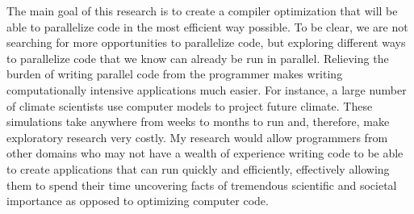 \documentclass[a4paper,12pt]{article}
\begin{document}



The main goal of this research is to create a compiler optimization that will be able to parallelize code in the most efficient way possible. To be clear, we are not searching for more opportunities to parallelize code, but exploring different ways to parallelize code that we know can already be run in parallel. Relieving the burden of writing parallel code from the programmer makes writing computationally intensive applications much easier. For instance, a large number of climate scientists use computer models to project future climate. These simulations take anywhere from weeks to months to run and, therefore, make exploratory research very costly. My research would allow programmers from other domains who may not have a wealth of experience writing code to be able to create applications that can run quickly and efficiently, effectively allowing them to spend their time uncovering facts of tremendous scientific and societal importance as opposed to optimizing computer code.
\end{document}
